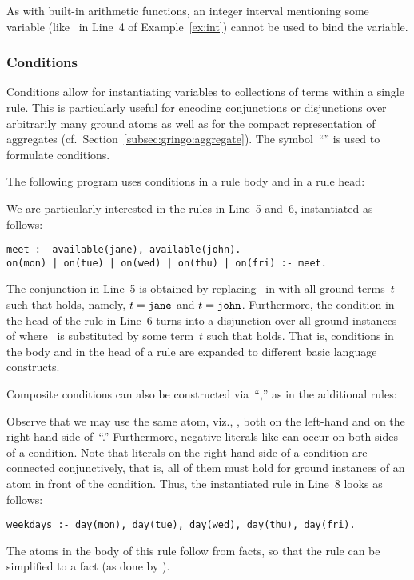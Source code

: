 As with built-in arithmetic functions,
an integer interval mentioning some variable (like~ in Line~4 of Example~\ref{ex:int})
cannot be used to bind the variable.


\subsubsection{Conditions}\label{subsec:gringo:condition}

Conditions allow for instantiating variables to
collections of terms within a single rule.
This is particularly useful for encoding conjunctions or disjunctions over
arbitrarily many ground atoms as well as for the compact representation of aggregates
(cf.\ Section~\ref{subsec:gringo:aggregate}).
The symbol~``\code{:}'' is used to formulate conditions.

\begin{example}\label{ex:cond}
The following program uses conditions in a rule body and in a rule head:
%

%
We are particularly interested in the rules in Line~5 and~6,
instantiated as follows:%
%
\begin{lstlisting}[firstnumber=5]
meet :- available(jane), available(john).
on(mon) | on(tue) | on(wed) | on(thu) | on(fri) :- meet.
\end{lstlisting}
%
The conjunction in Line~5 is obtained by replacing~ in
 with all ground terms~$t$ such that
 holds, namely, $t=\texttt{jane}$ and $t=\texttt{john}$.
Furthermore, the condition in the head of the rule in Line~6 turns into
a disjunction over all ground instances of
 where~ is substituted by some term~$t$
such that
 holds.
That is, conditions in the body and in the head of a rule
are expanded to different basic language constructs.

Composite conditions can also be constructed via~``\code{:},''
as in the additional rules:
%

%
Observe that we may use the same atom, viz., ,
both on the left-hand and on the right-hand side of~``\code{:}.''
Furthermore, negative literals like 
can occur on both sides of a condition.
Note that literals on the right-hand side of a condition are connected conjunctively, that is,
all of them must hold for ground instances of an atom in front
of the condition.
Thus, the instantiated rule in Line~8 looks as follows:
%
\begin{lstlisting}[firstnumber=8]
weekdays :- day(mon), day(tue), day(wed), day(thu), day(fri).
\end{lstlisting}
%
The atoms in the body of this rule follow from facts, so that
the rule can be simplified to a fact 
(as done by \gringo).
\eexample
\end{example}

